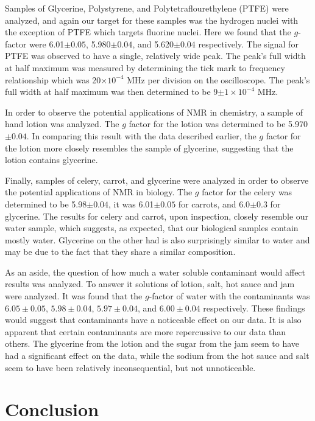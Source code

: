 \documentclass[prb,preprint]{revtex4-1}
\begin{document}
Samples of Glycerine, Polystyrene, and Polytetraflourethylene (PTFE) were analyzed, and again our target for these samples was the hydrogen nuclei with the exception of PTFE which targets fluorine nuclei. Here we found that the $g$-factor were 6.01$\pm0.05$, 5.980$\pm0.04$, and 5.620$\pm0.04$ respectively. The signal for PTFE was observed to have a single, relatively wide peak. The peak's full width at half maximum was measured by determining the tick mark to frequency relationship which was 20$\times10^{-4}$ MHz per division on the oscilloscope. The peak's full width at half maximum was then determined to be 9$\pm1\times10^{-4}$ MHz.

In order to observe the potential applications of NMR in chemistry, a sample of hand lotion was analyzed. The $g$ factor for the lotion was determined to be 5.970$\pm0.04$. In comparing this result with the data described earlier, the $g$ factor for the lotion more closely resembles the sample of glycerine, suggesting that the lotion contains glycerine.

Finally, samples of celery, carrot, and glycerine were analyzed in order to observe the potential applications of NMR in biology. The $g$ factor for the celery was determined to be 5.98$\pm0.04$, it was 6.01$\pm0.05$ for carrots, and 6.0$\pm0.3$ for glycerine. The results for celery and carrot, upon inspection, closely resemble our water sample, which suggests, as expected, that our biological samples contain mostly water. Glycerine on the other had is also surprisingly similar to water and may be due to the fact that they share a similar composition.

As an aside, the question of how much a water soluble contaminant would affect results was analyzed. To answer it solutions of lotion, salt, hot sauce and jam were analyzed. It was found that the $g$-factor of water with the contaminants was $6.05\pm0.05$, $5.98\pm0.04$, $5.97\pm0.04$, and $6.00\pm0.04$ respectively. These findings would suggest that contaminants have a noticeable effect on our data. It is also apparent that certain contaminants are more repercussive to our data than others. The glycerine from the lotion and the sugar from the jam seem to have had a significant effect on the data, while the sodium from the hot sauce and salt seem to have been relatively inconsequential, but not unnoticeable.

\newpage

\section{Conclusion}
\end{document}
